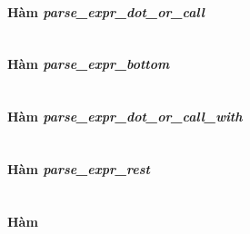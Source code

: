 {\paragraph{Hàm \textit{parse\_expr\_dot\_or\_call}}
\label{ap1:expr_dot_or_call}
\begin{lstlisting}

\end{lstlisting}

\paragraph{Hàm \textit{parse\_expr\_bottom}}
\label{ap1:expr_bottom}
\begin{lstlisting}

\end{lstlisting}

\paragraph{Hàm \textit{parse\_expr\_dot\_or\_call\_with}}
\label{ap1:expr_dot_or_call_with}
\begin{lstlisting}

\end{lstlisting}

\paragraph{Hàm \textit{parse\_expr\_rest}}
\label{ap1:expr_rest}
\begin{lstlisting}

\end{lstlisting}


}

\paragraph{Hàm \textit{}}
\label{ap1:}
\begin{lstlisting}

\end{lstlisting}

\begin{lstlisting}

\end{lstlisting}